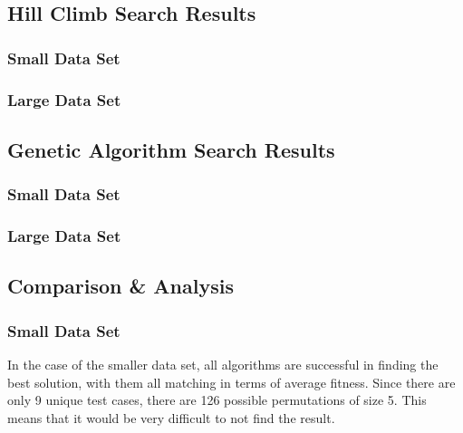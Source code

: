 \documentclass[11pt, a4paper]{article}
\begin{document}
\subsection{Hill Climb Search Results}
\subsubsection{Small Data Set} %
\label{ssub:hill_small_data_set}
 

\subsubsection{Large Data Set} %
\label{ssub:hill_large_data_set}
 

\subsection{Genetic Algorithm Search Results}
\subsubsection{Small Data Set} %
\label{ssub:ga_small_data_set}
 

\subsubsection{Large Data Set} %
\label{ssub:ga_large_data_set}
 

\subsection{Comparison \& Analysis} %
\label{sub:comparison_&_analysis}
\subsubsection{Small Data Set} %
\label{ssub:small_data_set}
In the case of the smaller data set, all algorithms are successful in finding
the best solution, with them all matching in terms of average fitness. Since
there are only 9 unique test cases, there are 126 possible permutations of
size 5. This means that it would be very difficult to not find the result. 
\end{document}
